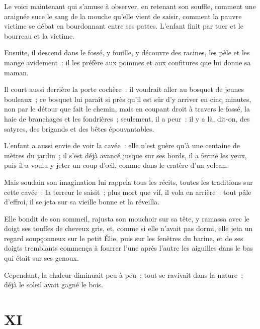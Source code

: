 \documentclass[french,twoside]{book} %
\begin{document}
Le voici maintenant qui s’amuse à observer, en retenant son souffle, comment une araignée suce le sang de la mouche qu’elle vient de saisir, comment la pauvre victime se débat en bourdonnant entre ses pattes. L’enfant finit par tuer et le bourreau et la victime.\par
Ensuite, il descend dans le fossé, y fouille, y découvre des racines, les pèle et les mange avidement : il les préfère aux pommes et aux confitures que lui donne sa maman.\par
Il court aussi derrière la porte cochère : il voudrait aller au bosquet de jeunes bouleaux ; ce bosquet lui paraît si près qu’il est sûr d’y arriver en cinq minutes, non par le détour que fait le chemin, mais en coupant droit à travers le fossé, la haie de branchages et les fondrières ; seulement, il a peur : il y a là, dit-on, des satyres, des brigands et des bêtes épouvantables.\par
L’enfant a aussi envie de voir la cavée : elle n’est guère qu’à une centaine de mètres du jardin ; il s’est déjà avancé jusque sur ses bords, il a fermé les yeux, puis il a voulu y jeter un coup d’œil, comme dans le cratère d’un volcan.\par
Mais soudain son imagination lui rappela tous les récits, toutes les traditions sur cette cavée : la terreur le saisit ; plus mort que vif, il vola en arrière : tout pâle d’effroi, il se jeta sur sa vieille bonne et la réveilla.\par
Elle bondit de son sommeil, rajusta son mouchoir sur sa tête, y ramassa avec le doigt ses touffes de cheveux gris, et, comme si elle n’avait pas dormi, elle jeta un regard soupçonneux sur le petit Élie, puis sur les fenêtres du barine, et de ses doigts tremblants commença à fourrer l’une après l’autre les aiguilles dans le bas qui était sur ses genoux.\par
Cependant, la chaleur diminuait peu à peu ; tout se ravivait dans la nature ; déjà le soleil avait gagné le bois.
\section[{XI}]{XI}\renewcommand{\leftmark}{XI}
\end{document}
